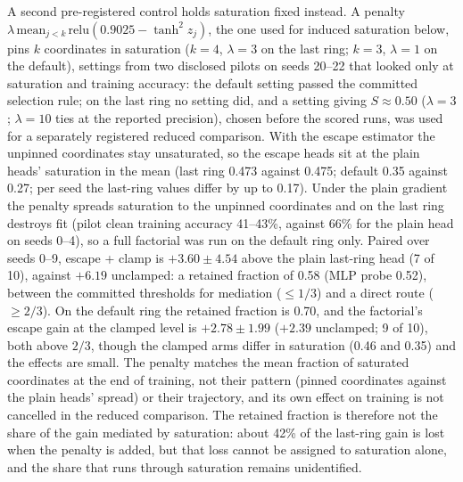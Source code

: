 A second pre-registered control holds saturation fixed instead. A penalty $\lambda\,\mathrm{mean}_{j<k}\,\mathrm{relu}(0.9025-\tanh^2z_j)$, the one used for induced saturation below, pins $k$ coordinates in saturation ($k=4$, $\lambda=3$ on the last ring; $k=3$, $\lambda=1$ on the default), settings from two disclosed pilots on seeds 20--22 that looked only at saturation and training accuracy: the default setting passed the committed selection rule; on the last ring no setting did, and a setting giving $S\approx0.50$ ($\lambda=3$; $\lambda=10$ ties at the reported precision), chosen before the scored runs, was used for a separately registered reduced comparison. With the escape estimator the unpinned coordinates stay unsaturated, so the escape heads sit at the plain heads' saturation in the mean (last ring 0.473 against 0.475; default 0.35 against 0.27; per seed the last-ring values differ by up to 0.17). Under the plain gradient the penalty spreads saturation to the unpinned coordinates and on the last ring destroys fit (pilot clean training accuracy 41--43\%, against 66\% for the plain head on seeds 0--4), so a full factorial was run on the default ring only. Paired over seeds 0--9, escape + clamp is $+3.60\pm4.54$ above the plain last-ring head (7 of 10), against $+6.19$ unclamped: a retained fraction of 0.58 (MLP probe 0.52), between the committed thresholds for mediation ($\le1/3$) and a direct route ($\ge2/3$). On the default ring the retained fraction is 0.70, and the factorial's escape gain at the clamped level is $+2.78\pm1.99$ ($+2.39$ unclamped; 9 of 10), both above $2/3$, though the clamped arms differ in saturation (0.46 and 0.35) and the effects are small. The penalty matches the mean fraction of saturated coordinates at the end of training, not their pattern (pinned coordinates against the plain heads' spread) or their trajectory, and its own effect on training is not cancelled in the reduced comparison. The retained fraction is therefore not the share of the gain mediated by saturation: about 42\% of the last-ring gain is lost when the penalty is added, but that loss cannot be assigned to saturation alone, and the share that runs through saturation remains unidentified.

